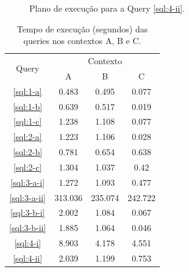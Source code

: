 \documentclass[a4paper,12pt]{article}
\begin{document}
\begin{figure}[hpt]
   \ContinuedFloat
   \begin{center}
   \end{center}
   \caption{Plano de execução para a Query \ref{sql:4-ii}.}
\end{figure}

\begin{table}[hpt]
   \centering
   \begin{tabular}{c c c c}
      \toprule
      \multirow{2}{*}{Query} & \multicolumn{3}{c}{Contexto} \\\cline{2-4}
      & A & B & C \\\midrule
      \ref{sql:1-a} & 0.483 & 0.495 & 0.077 \\\midrule
      \ref{sql:1-b} & 0.639 & 0.517 & 0.019 \\\midrule
      \ref{sql:1-c} & 1.238 & 1.108 & 0.077 \\\midrule
      \ref{sql:2-a} & 1.223 & 1.106 & 0.028 \\\midrule
      \ref{sql:2-b} & 0.781 & 0.654 & 0.638 \\\midrule
      \ref{sql:2-c} & 1.304 & 1.037 & 0.42 \\\midrule
      \ref{sql:3-a-i} & 1.272 & 1.093 & 0.477 \\\midrule
      \ref{sql:3-a-ii} & 313.036 & 235.074 & 242.722 \\\midrule
      \ref{sql:3-b-i} & 2.002 & 1.084 & 0.067 \\\midrule
      \ref{sql:3-b-ii} & 1.885 & 1.064 & 0.046 \\\midrule
      \ref{sql:4-i} & 8.903 & 4.178 & 4.551 \\\midrule
      \ref{sql:4-ii} & 2.039 & 1.199 & 0.753 \\\bottomrule
   \end{tabular}
   \caption{Tempo de execução (segundos) das queries nos contextos A, B e C.}
   \label{tab:tempo}
\end{table}
\end{document}
